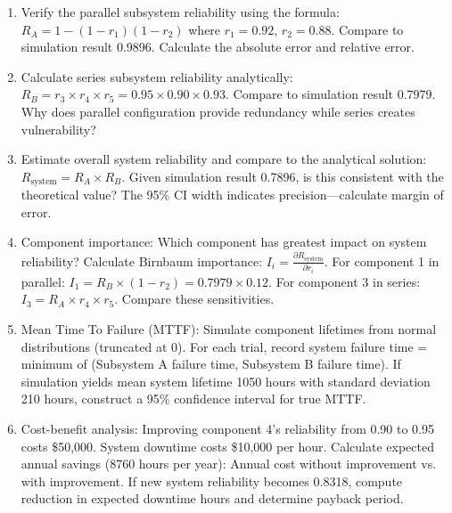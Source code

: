 \documentclass[12pt]{article}
\begin{document}
\begin{enumerate}[label=(\alph*)]
\item Verify the parallel subsystem reliability using the formula: $R_A = 1 - (1-r_1)(1-r_2)$ where $r_1 = 0.92$, $r_2 = 0.88$. Compare to simulation result 0.9896. Calculate the absolute error and relative error.

\item Calculate series subsystem reliability analytically: $R_B = r_3 \times r_4 \times r_5 = 0.95 \times 0.90 \times 0.93$. Compare to simulation result 0.7979. Why does parallel configuration provide redundancy while series creates vulnerability?

\item Estimate overall system reliability and compare to the analytical solution: $R_{\text{system}} = R_A \times R_B$. Given simulation result 0.7896, is this consistent with the theoretical value? The 95\% CI width indicates precision—calculate margin of error.

\item Component importance: Which component has greatest impact on system reliability? Calculate Birnbaum importance: $I_i = \frac{\partial R_{\text{system}}}{\partial r_i}$. For component 1 in parallel: $I_1 = R_B \times (1-r_2) = 0.7979 \times 0.12$. For component 3 in series: $I_3 = R_A \times r_4 \times r_5$. Compare these sensitivities.

\item Mean Time To Failure (MTTF): Simulate component lifetimes from normal distributions (truncated at 0). For each trial, record system failure time = minimum of (Subsystem A failure time, Subsystem B failure time). If simulation yields mean system lifetime 1050 hours with standard deviation 210 hours, construct a 95\% confidence interval for true MTTF.

\item Cost-benefit analysis: Improving component 4's reliability from 0.90 to 0.95 costs \$50,000. System downtime costs \$10,000 per hour. Calculate expected annual savings (8760 hours per year): Annual cost without improvement vs. with improvement. If new system reliability becomes 0.8318, compute reduction in expected downtime hours and determine payback period.
\end{enumerate}

\end{document}
